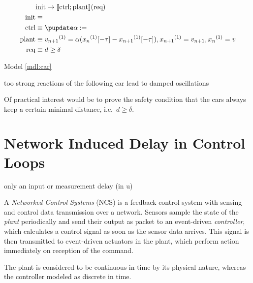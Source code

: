     \begin{algorithm}
        \caption{}
        \label{mdl:car} %
        \begin{align*}
            &\init \limply \dbox{\ctrl;\plant}{(\req)}\\
            \init &\equiv \\
            \ctrl &\equiv \hupdate{\humod{\alpha}{}}\\
            \plant &\equiv \hevolve{
                \D{v_{n+1}} = \alpha(\D{x_n}[-\tau]-\D{x_{n+1}}[-\tau])\syssep
                \D{x_{n+1}} = v_{n+1}\syssep
                \D{x_n} = v
            }\\
            \req &\equiv d\geq\delta
        \end{align*}
    \end{algorithm}

    Model \ref{mdl:car}

    too strong reactions of the following car lead to damped oscillations

    Of practical interest would be to prove the safety condition that the cars always keep a certain minimal distance, i.e.\ $d\geq\delta$.

\section{Network Induced Delay in Control Loops}

    

    only an input or measurement delay (in u)

    A \emph{Networked Control Systems} (NCS) is a feedback control system with sensing and control data transmission over a network.
    Sensors sample the state of the \emph{plant} periodically and send their output as packet to an event-driven \emph{controller}, which calculates a control signal as soon as the sensor data arrives. This signal is then transmitted to event-driven actuators in the plant, which perform action immediately on reception of the command.


    The plant is considered to be continuous in time by its physical nature, whereas the controller modeled as discrete in time.

